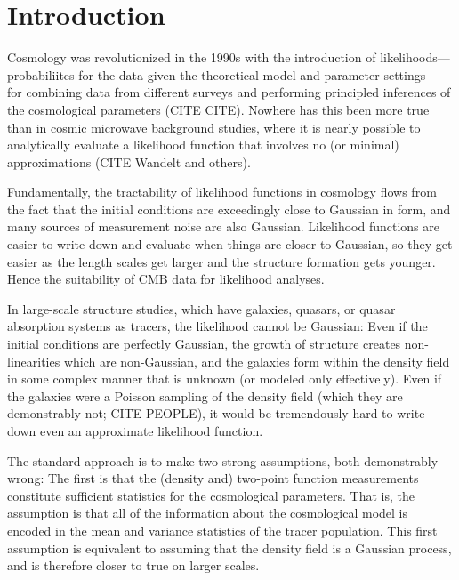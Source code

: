 \section{Introduction}

Cosmology was revolutionized in the 1990s with the introduction of likelihoods---%
pro\-ba\-bil\-iites for the data given the theoretical model and parameter settings---%
for combining data from different surveys and performing principled inferences of
the cosmological parameters (CITE CITE).
Nowhere has this been more true than in cosmic microwave background studies,
where it is nearly possible to analytically evaluate a likelihood function that
involves no (or minimal) approximations (CITE Wandelt and others).

Fundamentally, the tractability of likelihood functions in cosmology flows from
the fact that the initial conditions are exceedingly close to Gaussian in form,
and many sources of measurement noise are also Gaussian.
Likelihood functions are easier to write down and evaluate when things are closer to Gaussian,
so they get easier as the length scales get larger and the structure formation gets
younger.
Hence the suitability of CMB data for likelihood analyses.

In large-scale structure studies, which have galaxies, quasars, or quasar absorption
systems as tracers, the likelihood cannot be Gaussian:
Even if the initial conditions are perfectly Gaussian, the growth of structure
creates non-linearities which are non-Gaussian, and the galaxies form
within the density field in some complex manner that is unknown (or modeled only effectively).
Even if the galaxies were a Poisson sampling of the density field (which they are demonstrably
not; CITE PEOPLE), it would be tremendously hard to write down even an approximate
likelihood function.

The standard approach is to make two strong assumptions, both demonstrably wrong:
The first is that the (density and) two-point function measurements constitute
sufficient statistics for the cosmological parameters.
That is, the assumption is that all of the information about the cosmological model is
encoded in the mean and variance statistics of the tracer population.
This first assumption is equivalent to assuming that the density field is a Gaussian process,
and is therefore closer to true on larger scales.

